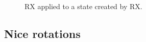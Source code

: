 \documentclass[11pt, letterpaper]{article}
\newcommand{\myvspace}[1]{\vspace{0.0in}}
\begin{document}
\begin{figure}[hbt]
\begin{centering}
		{\setlength\fboxsep{0pt}}\hspace{\zyx\columnwidth}
		{\setlength\fboxsep{0pt}}
		\caption{RX applied to a state created by RX.} 
		\label{fig:rx}
	\end{centering}
\end{figure}
\myvspace{-.1in}
 
 \newpage
 \subsection{Nice rotations}
\label{sec:rot}
\end{document}

